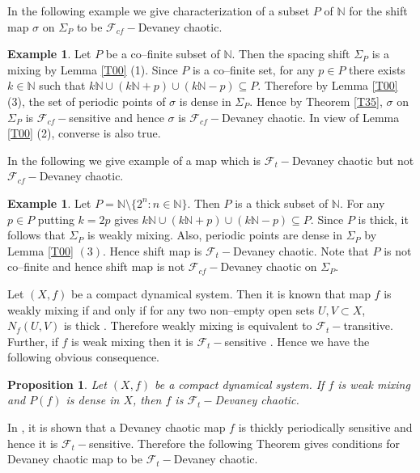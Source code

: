 \documentclass{amsart}[12pt, papera4]
\newtheorem{proposition}[theorem]{Proposition}
\theoremstyle{definition}
\newtheorem{example}[theorem]{Example}
\theoremstyle{remark}
\numberwithin{equation}{section}
\def\N{{\mathbb N}}
\def\F{{\mathscr{F}}}
\begin{document}
\smallskip
\noindent In the following example we give characterization of a subset $P$ of $\N$ for the shift map $\sigma$ on $\Sigma_P$ to be $\F_{cf}-$Devaney chaotic.

\smallskip
\begin{example}
	Let $P$ be a co--finite subset of $\N$. Then the spacing shift $\Sigma_P$ is a mixing by Lemma \ref{T00} (1). Since $P$ is a co--finite set, for any $p\in P$ there exists $k\in \N$ such that $k\N\cup (k\N+p) \cup (k\N-p)\subseteq P$. Therefore by Lemma \ref{T00} (3), the set of periodic points of $\sigma$ is dense in $\Sigma_P$. Hence by Theorem \ref{T35}, $\sigma$ on $\Sigma_P$ is $\mathscr{F}_{cf}-$sensitive and hence $\sigma$ is $\mathscr{F}_{cf}-$Devaney chaotic. In view of Lemma \ref{T00} (2), converse is also true.
\end{example}


\smallskip
\noindent In the following we give example of a map which is $\F_t-$Devaney chaotic but not $\F_{cf}-$Devaney chaotic.
\begin{example}
	Let $P=\N\setminus \{2^n:n\in \N\}$. Then $P$ is a thick subset of $\N$. For any $p\in P$ putting $k=2p$ gives $k\N\cup (k\N+p) \cup (k\N-p)\subseteq P$. Since $P$ is thick, it follows that $\Sigma_P$ is weakly mixing. Also, periodic points are dense in $\Sigma_P$ by Lemma \ref{T00} $(3)$. Hence shift map is $\F_t-$Devaney chaotic. Note that $P$ is not co--finite and hence shift map is not $\F_{cf}-$Devaney chaotic on $\Sigma_P$.
\end{example}


\medskip
\noindent Let $(X,f)$ be a compact dynamical system. Then it is known that map $f$ is weakly mixing if and only if for any two non--empty open sets $U,V\subset X$, $N_f(U,V)$ is thick \cite{Huang}. Therefore weakly mixing is equivalent to $\F_t-$transitive. Further, if $f$ is weak mixing then it is $\mathscr{F}_t-$sensitive \cite{Liu}. Hence we have the following obvious consequence. 

\begin{proposition}
	Let $(X,f)$ be a compact dynamical system. If $f$ is weak mixing and $P(f)$ is dense in $X$, then $f$ is $\F_t-$Devaney chaotic. 
\end{proposition}

\medskip
\noindent In \cite{Liu}, it is shown that a Devaney chaotic map $f$ is thickly periodically sensitive and hence it is $\F_t-$sensitive. Therefore the following Theorem gives conditions for Devaney chaotic map to be $\F_t-$Devaney chaotic.
\end{document}
